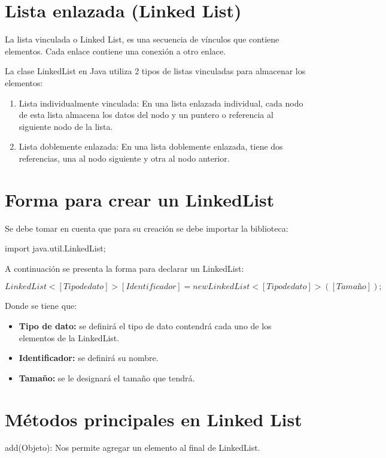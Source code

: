 \documentclass[12pt, letterpaper]{article} %
\begin{document}
\section*{Lista enlazada (Linked List)}
La lista vinculada o Linked List, es una secuencia de vínculos que contiene elementos. Cada enlace contiene una conexión a otro enlace.

La clase LinkedList en Java utiliza 2 tipos de listas vinculadas para almacenar los elementos:
\begin{enumerate}
    \item Lista individualmente vinculada: En una lista enlazada individual, cada nodo de esta lista almacena los datos del nodo y un puntero o referencia al siguiente nodo de la lista.

    \item Lista doblemente enlazada: En una lista doblemente enlazada, tiene dos referencias, una al nodo siguiente y otra al nodo anterior.
\end{enumerate}

\section*{Forma para crear un LinkedList}
Se debe tomar en cuenta que para su creación se debe importar la biblioteca:

\begin{center}
    import java.util.LinkedList;
\end{center}
A continuación se presenta la forma para declarar un LinkedList:

\begin{center}
    $LinkedList<[Tipo de dato]> [Identificador] = new LinkedList<[Tipo de dato]>([Tamaño]);$
\end{center}
Donde se tiene que:
\begin{itemize}
    \item \textbf{Tipo de dato:} se definirá el tipo de dato contendrá cada uno de los elementos de la LinkedList.
    \item \textbf{Identificador:} se definirá su nombre.
    \item \textbf{Tamaño:} se le designará el tamaño que tendrá.
\end{itemize}

\section*{Métodos principales en Linked List}
add(Objeto):
Nos permite agregar un elemento al final de LinkedList.
\end{document}
